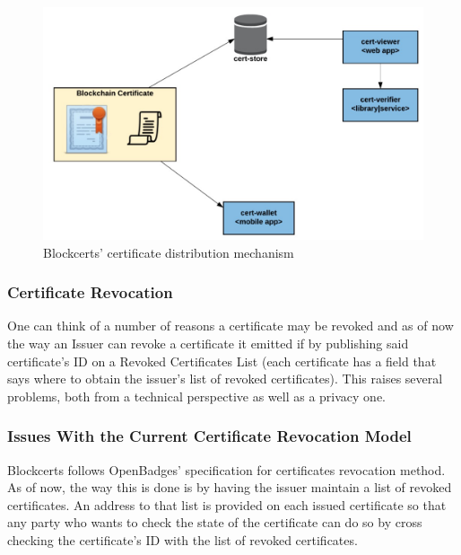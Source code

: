 \documentclass[llncsdoc]{llncs}
\begin{document}
\begin{figure}[t!]
  \includegraphics[width=\linewidth]{figures/cert_dist.jpg}
  \caption{Blockcerts' certificate distribution mechanism}
  \label{fig:blockcerts_dist}
\end{figure}

\subsubsection{Certificate Revocation}
\label{revoked}
One can think of a number of reasons a certificate may be revoked and as of now the way an Issuer can revoke a certificate it emitted if by publishing said certificate's ID on a Revoked Certificates List (each certificate has a field that says where to obtain the issuer's list of revoked certificates). This raises several problems, both from a technical perspective as well as a privacy one.


\subsubsection{Issues With the Current Certificate Revocation Model}
Blockcerts follows OpenBadges' specification for certificates revocation method. As of now, the way this is done is by having the issuer maintain a list of revoked certificates. An address to that list is provided on each issued certificate so that any party who wants to check the state of the certificate can do so by cross checking the certificate's ID with the list of revoked certificates.
\end{document}
